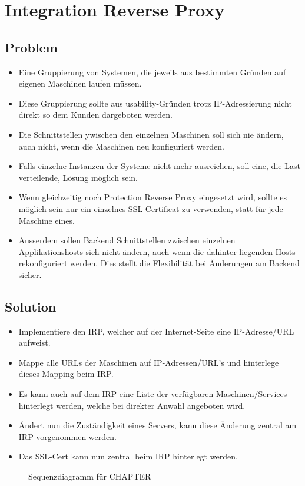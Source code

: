 \chapter{Integration Reverse Proxy}

\section{Problem}
\begin{itemize}
  \item Eine Gruppierung von Systemen, die jeweils aus bestimmten Gründen auf eigenen Maschinen laufen müssen.
  \item Diese Gruppierung sollte aus usability-Gründen trotz IP-Adressierung nicht direkt so dem Kunden dargeboten werden.
  \item Die Schnittstellen ywischen den einzelnen Maschinen soll sich nie ändern, auch nicht, wenn die Maschinen neu konfiguriert werden.
  \item Falls einzelne Instanzen der Systeme nicht mehr ausreichen, soll eine, die Last verteilende, Lösung möglich sein.
  \item Wenn gleichzeitig noch Protection Reverse Proxy eingesetzt wird, sollte es möglich sein nur ein einzelnes SSL Certificat zu verwenden, statt für jede Maschine eines.
  \item Ausserdem sollen Backend Schnittstellen zwischen einzelnen Applikationshosts sich nicht ändern, auch wenn die dahinter liegenden Hosts rekonfiguriert werden. Dies stellt die Flexibilität bei Änderungen am Backend sicher.
\end{itemize}

\section{Solution}
\begin{itemize}
  \item Implementiere den IRP, welcher auf der Internet-Seite eine IP-Adresse/URL aufweist.
  \item Mappe alle URLs der Maschinen auf IP-Adressen/URL's und hinterlege dieses Mapping beim IRP.
  \item Es kann auch auf dem IRP eine Liste der verfügbaren Maschinen/Services hinterlegt werden, welche bei direkter Anwahl angeboten wird.
  \item Ändert nun die Zuständigkeit eines Servers, kann diese Änderung zentral am IRP vorgenommen werden.
  \item Das SSL-Cert kann nun zentral beim IRP hinterlegt werden.
\end{itemize}
\begin{figure}[H]
  \centering
  
  \caption{Sequenzdiagramm f\"ur CHAPTER}
\end{figure}

